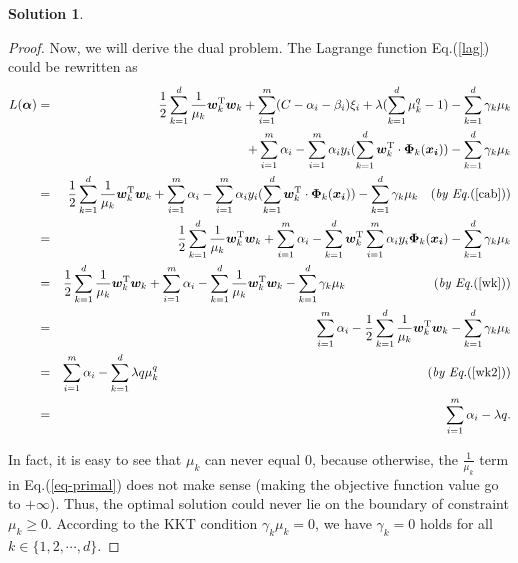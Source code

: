 \documentclass[a4paper,UTF8]{article}
\numberwithin{equation}{section}
\theoremstyle{definition}
\newtheorem*{solution}{Solution}
\begin{document}
\begin{solution}
\begin{proof}
Now, we will derive the dual problem. The Lagrange function Eq.(\ref{lag}) could be rewritten as
\begin{eqnarray}
L(\bm{\alpha})&=&\frac{1}{2}\sum_{k=1}^d\frac{1}{\mu_k}\bm{w}_k^\mathrm{T}\bm{w}_k+\sum_{i=1}^m(C-\alpha_i-\beta_i)\xi_i+\lambda(\sum_{k=1}^d\mu_k^q-1)-\sum_{k=1}^d\gamma_k\mu_k\nonumber\\
&&+\sum_{i=1}^m\alpha_i-\sum_{i=1}^m\alpha_iy_i(\sum_{k=1}^d\bm{w}_k^\mathrm{T}\cdot\bm{\Phi}_k(\bm{x_i}))-\sum_{k=1}^d\gamma_k\mu_k\nonumber\\
&=&\frac{1}{2}\sum_{k=1}^d\frac{1}{\mu_k}\bm{w}_k^\mathrm{T}\bm{w}_k+\sum_{i=1}^m\alpha_i-\sum_{i=1}^m\alpha_iy_i(\sum_{k=1}^d\bm{w}_k^\mathrm{T}\cdot\bm{\Phi}_k(\bm{x_i}))-\sum_{k=1}^d\gamma_k\mu_k\quad\text{(\textit{by Eq.}(\ref{cab}))}\nonumber\\
&=&\frac{1}{2}\sum_{k=1}^d\frac{1}{\mu_k}\bm{w}_k^\mathrm{T}\bm{w}_k+\sum_{i=1}^m\alpha_i-\sum_{k=1}^d\bm{w}_k^\mathrm{T}\sum_{i=1}^m\alpha_iy_i\bm{\Phi}_k(\bm{x_i})-\sum_{k=1}^d\gamma_k\mu_k\nonumber\\
&=&\frac{1}{2}\sum_{k=1}^d\frac{1}{\mu_k}\bm{w}_k^\mathrm{T}\bm{w}_k+\sum_{i=1}^m\alpha_i-\sum_{k=1}^d\frac{1}{\mu_k}\bm{w}_k^\mathrm{T}\bm{w}_k-\sum_{k=1}^d\gamma_k\mu_k\quad\quad\quad\quad\quad\quad\text{\quad(\textit{by Eq.}(\ref{wk}))}\nonumber\\
&=&\sum_{i=1}^m\alpha_i-\frac{1}{2}\sum_{k=1}^d\frac{1}{\mu_k}\bm{w}_k^\mathrm{T}\bm{w}_k-\sum_{k=1}^d\gamma_k\mu_k\nonumber\\
&=&\sum_{i=1}^m\alpha_i-\sum_{k=1}^d\lambda q\mu_k^{q}\quad\quad\quad\quad\quad\quad\quad\quad\ \quad\quad\quad\quad\quad\quad\quad\quad\quad\quad\quad\quad\text{\quad(\textit{by Eq.}(\ref{wk2}))}\nonumber\\
&=&\sum_{i=1}^m\alpha_i-\lambda q.
\end{eqnarray}

In fact, it is easy to see that $\mu_k$ can never equal 0, because otherwise, the $\frac{1}{\mu_k}$ term in Eq.(\ref{eq-primal}) does not make sense (making the objective function value go to $+\infty$). Thus, the optimal solution could never lie on the boundary of constraint $\mu_k\geq 0$. According to the KKT condition $\gamma_k\mu_k=0$, we have $\gamma_k=0$ holds for all $k\in\{1,2,\cdots, d\}$.


\end{proof}
\end{solution}
\end{document}
